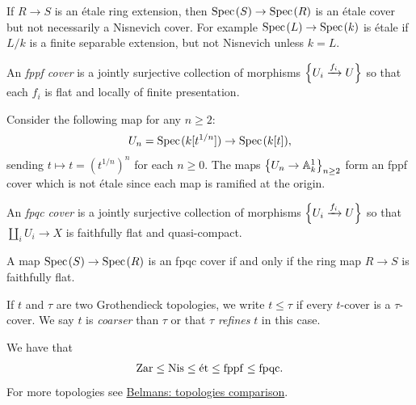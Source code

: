 \documentclass[11pt,openany]{book}
\begin{document}
\begin{note} If $R\to S$ is an \'etale ring extension, then $\text{Spec}\hspace{0.1em}(S) \to \text{Spec}\hspace{0.1em}(R)$ is an \'etale cover but not necessarily a Nisnevich cover. For example $\text{Spec}\hspace{0.1em}(L) \to \text{Spec}\hspace{0.1em}(k)$ is \'etale if $L/k$ is a finite separable extension, but not Nisnevich unless $k=L$.
\end{note}

\begin{example} \cite[021M]{Stacks} An \textit{fppf cover} is a jointly surjective collection of morphisms $\left\{ U_i \xrightarrow{f_i} U \right\}$ so that each $f_i$ is flat and locally of finite presentation.
\end{example}

\begin{example} Consider the following map for any $n\ge2$:
\begin{align*}
    U_n = \text{Spec}\hspace{0.1em}(k[t^{1/n}]) \to \text{Spec}\hspace{0.1em}(k[t]),
\end{align*}
sending $t \mapsto t = (t^{1/n})^n$ for each $n\ge 0$. The maps $\left\{ U_n \to \mathbb{A}^1_k \right\}_{n\ge2}$ form an fppf cover which is not \'etale since each map is ramified at the origin. 
\end{example}


\begin{example} \cite[03NW]{Stacks} An \textit{fpqc cover} is a jointly surjective collection of morphisms $\left\{ U_i \xrightarrow{f_i} U \right\}$ so that $\amalg_i U_i \to X$ is faithfully flat and quasi-compact.
\end{example}

\begin{example} A map $\text{Spec}\hspace{0.1em}(S) \to \text{Spec}\hspace{0.1em}(R)$ is an fpqc cover if and only if the ring map $R\to S$ is faithfully flat.
\end{example}



\begin{terminology} If $t$ and $\tau$ are two Grothendieck topologies, we write $t\le \tau$ if every $t$-cover is a $\tau$-cover. We say $t$ is \textit{coarser} than $\tau$ or that $\tau$ \textit{refines} $t$ in this case.
\end{terminology}

\begin{proposition} We have that
\begin{align*}
    \mathrm{Zar} \le \mathrm{Nis} \le \text{\'{e}t} \le \mathrm{fppf} \le \mathrm{fpqc}.
\end{align*}
For more topologies see \href{https://pbelmans.ncag.info/topologies-comparison/}{Belmans: topologies comparison}.
\end{proposition}
\end{document}
